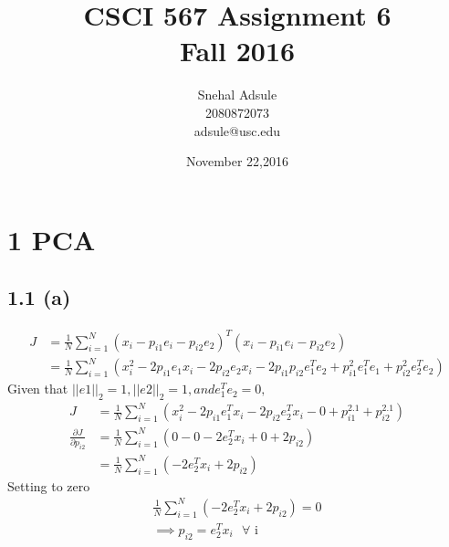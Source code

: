 \documentclass[10pt,letterpaper]{article}
\begin{document}
\title{CSCI 567 Assignment 6 \\Fall 2016}
\date{ November 22,2016}
\author{Snehal Adsule\\2080872073\\adsule@usc.edu}
\maketitle
\section{ 1 PCA}
\subsection{1.1 (a) }
\begin{align*}
	J &= \frac{1}{N} \sum_{i=1}^N (x_i -p_{i1}e_i -p_{i2}e_2)^T(x_i -p_{i1}e_i -p_{i2}e_2)\\
	&= \frac{1}{N} \sum_{i=1}^N (x_i^2 - 2p_{i1}e_1x_i - 2p_{i2}e_2x_i -2p_{i1}p_{i2}e_1^Te_2 + p_{i1}^2e_1^Te_1 + p_{i2}^2e_2^Te_2)
	\end{align*}
	Given that $||e1||_2 =1, ||e2||_2 = 1, and e_1^Te_2 = 0,$
	\begin{align*}
J&= \frac{1}{N} \sum_{i=1}^N (x_i^2 - 2p_{i1}e_1^Tx_i - 2p_{i2}e_2^Tx_i - 0 + p_{i1}^2.1 + p_{i2}^2.1)	\\
	\frac{\partial J}{\partial p_{i2}} &=  \frac{1}{N} \sum_{i=1}^N (0- 0-2e_2^Tx_i +0 +2p_{i2})\\
	&= \frac{1}{N} \sum_{i=1}^N (-2e_2^Tx_i+2p_{i2})
	\end{align*}
Setting to zero
	\begin{align*}
		 \frac{1}{N} \sum_{i=1}^N (-2e_2^Tx_i+2p_{i2})=0\\
		\implies   p_{i2} = e_2^Tx_i  \text{ $\forall$ i }
	\end{align*}
\end{document}
